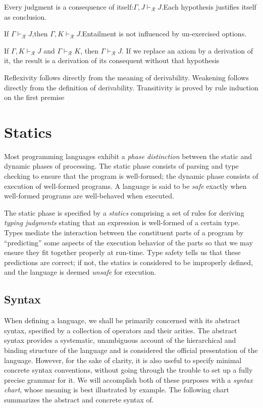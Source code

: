 \begin{property}[Reflexivity]
    Every judgment is a consequence of itself:$\Gamma, J \vdash_\mathcal{R} J$.Each hypothesis justifies itself as conclusion.
\end{property}

\begin{property}[Weakening]
  If $\Gamma \vdash_\mathcal{R} J$,then $\Gamma, K \vdash_\mathcal{R} J$.Entailment  is  not  influenced  by  un-exercised options.
\end{property}

\begin{property}[Transitivity]
  If $\Gamma, K \vdash_\mathcal{R} J$ and $\Gamma \vdash_\mathcal{R} K$, then
  $\Gamma \vdash_\mathcal{R} J$. If we replace an axiom  by a derivation of it,
  the result is a derivation of its consequent without that  hypothesis
\end{property}

Reflexivity follows directly from the meaning of derivability. Weakening follows directly
from the definition of derivability. Transitivity is proved by rule induction on the first
premise

\section{Statics}
Most programming languages exhibit a \textit{phase distinction} between the
static and dynamic phases of processing. The static phase consists of parsing
and type checking to ensure that the program is well-formed; the dynamic phase
consists of execution of well-formed programs. A language is said to be
\textit{safe} exactly when well-formed programs are well-behaved when executed.

The static phase is specified by a \textit{statics} comprising a set of rules
for deriving \textit{typing judgments} stating that an expression is well-formed
of a certain type. Types mediate the interaction between the constituent parts
of a program by “predicting” some aspects of the execution behavior of the parts
so that we may ensure they fit together properly at run-time. Type safety tells
us that these predictions are correct; if not, the statics is considered to be
improperly defined, and the language is deemed \textit{unsafe} for execution.

\subsection{Syntax}
When defining a language, we shall be primarily concerned with its abstract syntax,
specified by a collection of operators and their arities. The abstract syntax
provides a systematic, unambiguous account of the hierarchical and binding
structure of the language and is considered the official presentation of the language.
However, for the sake of clarity, it is also useful to specify minimal concrete syntax
conventions, without going through the trouble to set up a fully precise grammar for
it.
We will accomplish both of these purposes with a \textit{syntax chart}, whose meaning is
best illustrated by example. The following chart summarizes the abstract and concrete
syntax of.

